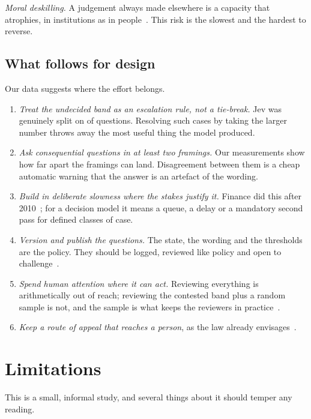 \documentclass[journal]{IEEEtran}
\begin{document}
\emph{Moral deskilling.} A judgement always made elsewhere is a capacity that atrophies, in
institutions as in people~\cite{vallor2015,bainbridge1983}. This risk is the slowest and the
hardest to reverse.


\subsection{What follows for design}

Our data suggests where the effort belongs.

\begin{enumerate}[leftmargin=1.5em]
  \item \emph{Treat the undecided band as an escalation rule, not a tie-break.} Jev was genuinely
    split on \NUndecided{} of \NFilmQuestions{} questions. Resolving such cases by taking the
    larger number throws away the most useful thing the model produced.
  \item \emph{Ask consequential questions in at least two framings.} Our measurements show how far
    apart the framings can land. Disagreement between them is a cheap automatic warning that the
    answer is an artefact of the wording.
  \item \emph{Build in deliberate slowness where the stakes justify it.} Finance did this after
    2010~\cite{kirilenko2017}; for a decision model it means a queue, a delay or a mandatory second
    pass for defined classes of case.
  \item \emph{Version and publish the questions.} The state, the wording and the thresholds are the
    policy. They should be logged, reviewed like policy and open to
    challenge~\cite{rahwan2018,mittelstadt2016}.
  \item \emph{Spend human attention where it can act.} Reviewing everything is arithmetically out
    of reach; reviewing the contested band plus a random sample is not, and the sample is what
    keeps the reviewers in practice~\cite{bainbridge1983,vallor2015}.
  \item \emph{Keep a route of appeal that reaches a person}, as the law already
    envisages~\cite{gdpr2016,euaiact2024}.
\end{enumerate}


\section{Limitations}\label{sec:limitations}

This is a small, informal study, and several things about it should temper any reading.
\end{document}
